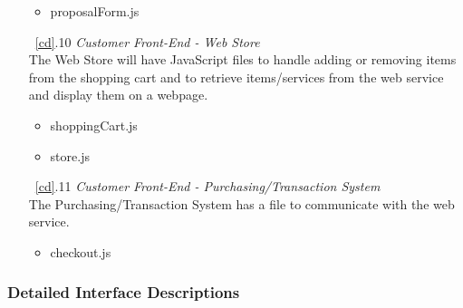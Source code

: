 \documentclass{article}
\newcommand{\br}{\vspace{2mm}}
\begin{document}
\begin{enumerate}
\begin{itemize}
            \item proposalForm.js
        \end{itemize}
    \item[~\ref{cd}.10 ] \emph{Customer Front-End - Web Store}\br\\
        The Web Store will have JavaScript files to handle adding or removing
        items from the shopping cart and to retrieve items/services from the
        web service and display them on a webpage.
        \begin{itemize}
            \item shoppingCart.js
            \item store.js
        \end{itemize}
    \item[~\ref{cd}.11 ] \emph{Customer Front-End - Purchasing/Transaction System}\br\\
        The Purchasing/Transaction System has a file to communicate with the
        web service.
        \begin{itemize}
            \item checkout.js
        \end{itemize}
\end{enumerate}


\subsubsection{Detailed Interface Descriptions}
\label{did}
\end{document}
